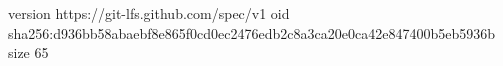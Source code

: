 version https://git-lfs.github.com/spec/v1
oid sha256:d936bb58abaebf8e865f0cd0ec2476edb2c8a3ca20e0ca42e847400b5eb5936b
size 65
